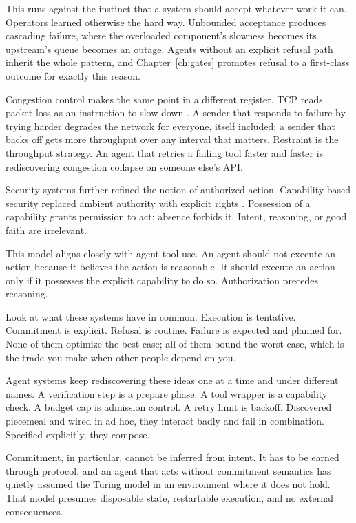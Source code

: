 This runs against the instinct that a system should accept whatever work it can.
Operators learned otherwise the hard way. Unbounded acceptance produces cascading
failure, where the overloaded component's slowness becomes its upstream's queue
becomes an outage. Agents without an explicit refusal path inherit the whole
pattern, and Chapter~\ref{ch:gates} promotes refusal to a first-class outcome for
exactly this reason.

Congestion control makes the same point in a different register. TCP reads packet
loss as an instruction to slow down \cite{jacobson1988congestion}. A sender that
responds to failure by trying harder degrades the network for everyone, itself
included; a sender that backs off gets more throughput over any interval that
matters. Restraint is the throughput strategy. An agent that retries a failing tool
faster and faster is rediscovering congestion collapse on someone else's API.

Security systems further refined the notion of authorized action. Capability-based
security replaced ambient authority with explicit rights
\cite{saltzer1975protection}. Possession of a capability grants permission to act;
absence forbids it. Intent, reasoning, or good faith are irrelevant.

This model aligns closely with agent tool use. An agent should not execute an
action because it believes the action is reasonable. It should execute an action
only if it possesses the explicit capability to do so. Authorization precedes
reasoning.

Look at what these systems have in common. Execution is tentative. Commitment is
explicit. Refusal is routine. Failure is expected and planned for. None of them
optimize the best case; all of them bound the worst case, which is the trade you
make when other people depend on you.

Agent systems keep rediscovering these ideas one at a time and under different
names. A verification step is a prepare phase. A tool wrapper is a capability
check. A budget cap is admission control. A retry limit is backoff. Discovered
piecemeal and wired in ad hoc, they interact badly and fail in combination.
Specified explicitly, they compose.

Commitment, in particular, cannot be inferred from intent. It has to be earned
through protocol, and an agent that acts without commitment semantics has quietly assumed the Turing model in an environment where it does not hold. That model presumes disposable state, restartable execution, and no external consequences.

